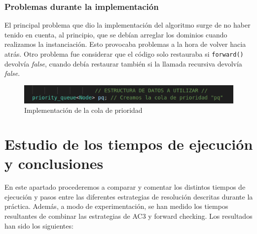 \documentclass[12pt]{article}
\begin{document}
\verb||
\textbf{}
\textit{}

\subsubsection{Problemas durante la implementación}

El principal problema que dio la implementación del algoritmo surge de no haber tenido en cuenta, al principio,
que se debían arreglar los dominios cuando realizamos la instanciación. Esto provocaba problemas a la hora de volver hacia atrás. Otro
problema fue considerar que el código solo restauraba si \verb|forward()| devolvía \textit{false}, cuando debía restaurar también si la 
llamada recursiva devolvía \textit{false}.

\begin{figure}[h]
    \centering
    \includegraphics[scale=0.5]{cola_de_prior.png}
    \caption{Implementación de la cola de prioridad}
    \label{fig:colprior}
\end{figure}

\section{Estudio de los tiempos de ejecución y conclusiones}\label{ch:tiempos}

En este apartado procederemos a comparar y comentar los distintos tiempos de ejecución y pasos entre las diferentes estrategias 
de resolución descritas durante la práctica. Además, a modo de experimentación, se han medido los tiempos resultantes de combinar
las estrategias de AC3 y forward checking. Los resultados han sido los siguientes:
\end{document}
